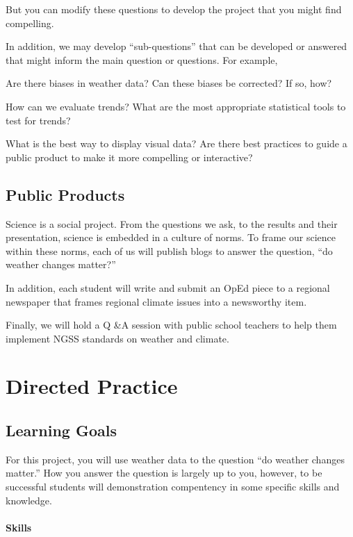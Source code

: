 \documentclass{article}\usepackage[]{graphicx}\usepackage[]{color}
\newenvironment{itemize*}%
  {\begin{itemize}%
    \setlength{\itemsep}{0pt}%
    \setlength{\parskip}{0pt}}%
  {\end{itemize}}
\begin{document}
But you can modify these questions to develop the project that you might find compelling.

In addition, we may develop ``sub-questions'' that can be developed or answered that might inform the main question or questions. For example, 

\begin{itemize*}
  \item Are there biases in weather data? Can these biases be corrected? If so, how?
  \item How can we evaluate trends? What are the most appropriate statistical tools to test for trends?
  \item What is the best way to display visual data?  Are there best practices to guide a public product to make it more compelling or interactive?
\end{itemize*}

\subsection{Public Products}

Science is a social project. From the questions we ask, to the results and their presentation, science is embedded in a culture of norms. To frame our science within these norms, each of us will publish blogs to answer the question, ``do weather changes matter?''

In addition, each student will write and submit an OpEd piece to a regional newspaper that frames regional climate issues into a newsworthy item.

Finally, we will hold a Q \&A session with public school teachers to help them implement NGSS standards on weather and climate.

\section{Directed Practice}

\subsection{Learning Goals}

For this project, you will use weather data to the question ``do weather changes matter.'' How you answer the question is largely up to you, however, to be successful students will demonstration compentency in some specific skills and knowledge. 

\paragraph{Skills}
\end{document}
